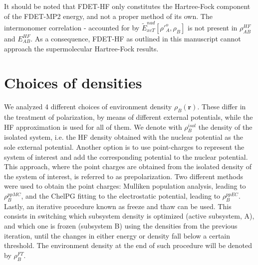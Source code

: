 \documentclass[journal=jctcce,manuscript=article, layout=twocolumn]{achemso}
\newcommand{\nr}[1]{\color{red}#1\color{black}}
\begin{document}
It should be noted that FDET-HF only constitutes the Hartree-Fock component of the FDET-MP2 energy, and not a proper method of its own. The intermonomer correlation - accounted for by $\tilde{E}_{xcT}^{nad}[\rho'^{o}_A,\rho_B]$ is not present in $\rho^{HF}_{AB}$ and $E^{HF}_{AB}$. As a consequence, FDET-HF as outlined in this manuscript cannot approach the supermolecular Hartree-Fock results.
 
 \section{Choices of densities} \label{sect:rho_B}
 We analyzed 4 different choices of environment density $\rho_B(\mathbf{r})$. These differ in the treatment of polarization, by means of different external potentials, while the HF approximation is used for all of them.
 We denote with $\rho_B^{isol}$ the density of the isolated system, i.e. the HF density obtained with the nuclear potential as the sole external potential.
 Another option is to use point-charges to represent the system of interest and add the corresponding potential to the nuclear potential. This approach, where the point charges are obtained from the isolated density of the system of interest, is referred to as prepolarization. Two different methods were used to obtain the point charges: Mulliken population analysis, leading to $\rho_B^{ppMC}$, and the ChelPG fitting to the electrostatic potential, leading to $\rho_B^{ppEC}$. 
 Lastly, an iterative procedure known as freeze and thaw can be used. This consists in switching which subsystem density is optimized (active subsystem, A), and which one is frozen (subsystem B) using the densities from the previous iteration, until the changes in either energy or density fall below a certain threshold. The environment density at the end of such procedure will be denoted by $\rho_B^{FT}$.
 
\end{document}
